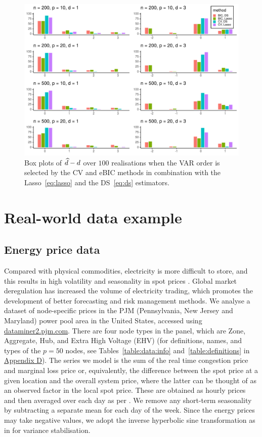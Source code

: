 \begin{figure}[htb!]
\centering
\includegraphics[width = .8\textwidth]{figs/order.pdf}
\caption{Box plots of $\widehat{d} - d$ over $100$ realisations when the VAR order is selected by the CV and eBIC methods in combination with the Lasso~\eqref{eq:lasso} and the DS~\eqref{eq:ds} estimators.}
\label{fig:order}
\end{figure}

\section{Real-world data example}
\label{sec:real}

\subsection{Energy price data}
\label{sec:real:energy}

Compared with physical commodities, electricity is more difficult to store, and this results in high volatility and seasonality in spot prices \citep{han2022extremal}.
Global market deregulation has increased the volume of electricity trading, which promotes the development of better forecasting and risk management methods. 
We analyse a dataset of node-specific prices in the PJM (Pennsylvania, New Jersey and Maryland) power pool area in the United States, accessed using \url{dataminer2.pjm.com}.
There are four node types in the panel, which are Zone, Aggregate, Hub, and Extra High Voltage (EHV) 
(for definitions, names, and types of the $p = 50$ nodes, see Tables~\ref{table:data:info} and~\ref{table:definitions} in \hyperref[sec:real:data]{Appendix D}).
The series we model is the sum of the real time congestion price and marginal loss price or, equivalently, the difference between the spot price at a given location and the overall system price, where the latter can be thought of as an observed factor in the local spot price.
These are obtained as hourly prices and then averaged over each day as per \cite{maciejowska2013forecasting}.
We remove any short-term seasonality by subtracting a separate mean for each day of the week. Since the energy prices may take negative values, we adopt the inverse hyperbolic sine transformation as in \cite{uniejewski2017variance} for variance stabilisation. 

